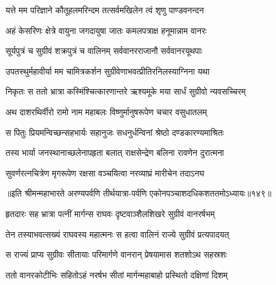 
\translink{}

\storymeta



\addtocounter{shlokacount}{25}

\twolineshloka
{यत्ते मम परिज्ञाने कौतूहलमरिन्दम}
{तत्सर्वमखिलेन त्वं शृणु पाण्डवनन्दन}


\twolineshloka
{अहं केसरिणः क्षेत्रे वायुना जगदायुषा}
{जातः कमलपत्राक्ष हनूमान्नाम वानरः}


\twolineshloka
{सूर्यपुत्रं च सुग्रीवं शक्रपुत्रं च वालिनम्}
{सर्ववानरराजानौ सर्ववानरयूथपाः}


\twolineshloka
{उपतस्थुर्महावीर्या मम चामित्रकर्शन}
{सुग्रीवेणाभवत्प्रीतिरनिलस्याग्निना यथा}


\twolineshloka
{निकृतः स ततो भ्रात्रा कस्मिंश्चित्कारणान्तरे}
{ऋश्यमूके मया सार्धं सुग्रीवो न्यवसच्चिरम्}


\twolineshloka
{अथ दाशरथिर्वीरो रामो नाम महाबलः}
{विष्णुर्मानुषरूपेण चचार वसुधातलम्}


\twolineshloka
{स पितुः प्रियमन्विच्छन्सहभार्यः सहानुजः}
{सधनुर्धन्विनां श्रेष्ठो दण्डकारण्यमाश्रितः}


\twolineshloka
{तस्य भार्या जनस्थानाच्छलेनापहृता बलात्}
{राक्षसेन्द्रेण बलिना रावणेन दुरात्मना}


\twolineshloka
{सुवर्णरत्नचित्रेण मृगरूपेण रक्षसा}
{वञ्चयित्वा नरव्याघ्रं मारीचेन तदाऽनघ}

॥इति श्रीमन्महाभारते अरण्यपर्वणि तीर्थयात्रा-पर्वणि एकोनपञ्चाशदधिकशततमोऽध्यायः॥१४९॥




\twolineshloka
{हृतदारः सह भ्रात्रा पत्नीं मार्गन्स राघवः}
{दृष्टवाञ्शैलशिखरे सुग्रीवं वानरर्षभम्}


\twolineshloka
{तेन तस्याभवत्सख्यं राघवस्य महात्मनः}
{स हत्वा वालिनं राज्ये सुग्रीवं प्रत्यपादयत्}


\twolineshloka
{स राज्यं प्राप्य सुग्रीवः सीतायाः परिमार्गणे}
{वानरान् प्रेषयामास शतशोऽथ सहस्रशः}


\twolineshloka
{ततो वानरकोटीभिः सहितोऽहं नरर्षभ}
{सीतां मार्गन्महाबाहो प्रस्थितो दक्षिणां दिशम्}



